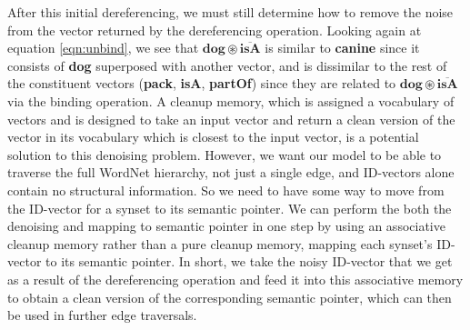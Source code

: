 \documentclass[10pt,letterpaper]{article}
\begin{document}
After this initial dereferencing, we must still determine how to remove the noise from the vector returned by the dereferencing operation. Looking again at equation \eqref{eqn:unbind}, we see that $\mathbf{dog \circledast \overline{isA}}$ is similar to \textbf{canine} since it consists of \textbf{dog} superposed with another vector, and is dissimilar to the rest of the constituent vectors (\textbf{pack}, \textbf{isA}, \textbf{partOf}) since they are related to $\mathbf{dog \circledast \overline{isA}}$ via the binding operation. A cleanup memory, which is assigned a vocabulary of vectors and is designed to take an input vector and return a clean version of the vector in its vocabulary which is closest to the input vector, is a potential solution to this denoising problem. However, we want our model to be able to traverse the full WordNet hierarchy, not just a single edge, and ID-vectors alone contain no structural information. So we need to have some way to move from the ID-vector for a synset to its semantic pointer. We can perform the both the denoising and mapping to semantic pointer in one step by using an associative cleanup memory rather than a pure cleanup memory, mapping each synset's ID-vector to its semantic pointer. In short, we take the noisy ID-vector that we get as a result of the dereferencing operation and feed it into this associative memory to obtain a clean version of the corresponding semantic pointer, which can then be used in further edge traversals.

%
%
\end{document}
